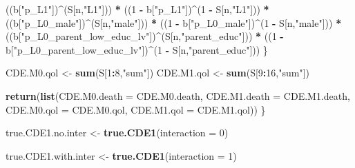 \documentclass[
]{book}
\newenvironment{Shaded}{\begin{snugshade}}{\end{snugshade}}
\newcommand{\AttributeTok}[1]{\textcolor[rgb]{0.13,0.29,0.53}{#1}}
\newcommand{\DecValTok}[1]{\textcolor[rgb]{0.00,0.00,0.81}{#1}}
\newcommand{\FunctionTok}[1]{\textcolor[rgb]{0.13,0.29,0.53}{\textbf{#1}}}
\newcommand{\NormalTok}[1]{#1}
\newcommand{\OtherTok}[1]{\textcolor[rgb]{0.56,0.35,0.01}{#1}}
\newcommand{\SpecialCharTok}[1]{\textcolor[rgb]{0.81,0.36,0.00}{\textbf{#1}}}
\newcommand{\StringTok}[1]{\textcolor[rgb]{0.31,0.60,0.02}{#1}}
\begin{document}
\begin{Shaded}
\begin{Highlighting}[]
\NormalTok{      ((b[}\StringTok{"p\_L1"}\NormalTok{])}\SpecialCharTok{\^{}}\NormalTok{(S[n,}\StringTok{"L1"}\NormalTok{])) }\SpecialCharTok{*}
\NormalTok{      ((}\DecValTok{1} \SpecialCharTok{{-}}\NormalTok{ b[}\StringTok{"p\_L1"}\NormalTok{])}\SpecialCharTok{\^{}}\NormalTok{(}\DecValTok{1} \SpecialCharTok{{-}}\NormalTok{ S[n,}\StringTok{"L1"}\NormalTok{])) }\SpecialCharTok{*}
\NormalTok{      ((b[}\StringTok{"p\_L0\_male"}\NormalTok{])}\SpecialCharTok{\^{}}\NormalTok{(S[n,}\StringTok{"male"}\NormalTok{])) }\SpecialCharTok{*} 
\NormalTok{      ((}\DecValTok{1} \SpecialCharTok{{-}}\NormalTok{ b[}\StringTok{"p\_L0\_male"}\NormalTok{])}\SpecialCharTok{\^{}}\NormalTok{(}\DecValTok{1} \SpecialCharTok{{-}}\NormalTok{ S[n,}\StringTok{"male"}\NormalTok{])) }\SpecialCharTok{*} 
\NormalTok{      ((b[}\StringTok{"p\_L0\_parent\_low\_educ\_lv"}\NormalTok{])}\SpecialCharTok{\^{}}\NormalTok{(S[n,}\StringTok{"parent\_educ"}\NormalTok{])) }\SpecialCharTok{*}
\NormalTok{      ((}\DecValTok{1} \SpecialCharTok{{-}}\NormalTok{ b[}\StringTok{"p\_L0\_parent\_low\_educ\_lv"}\NormalTok{])}\SpecialCharTok{\^{}}\NormalTok{(}\DecValTok{1} \SpecialCharTok{{-}}\NormalTok{ S[n,}\StringTok{"parent\_educ"}\NormalTok{])) }
\NormalTok{    \}}
  
\NormalTok{  CDE.M0.qol }\OtherTok{\textless{}{-}} \FunctionTok{sum}\NormalTok{(S[}\DecValTok{1}\SpecialCharTok{:}\DecValTok{8}\NormalTok{,}\StringTok{"sum"}\NormalTok{])}
\NormalTok{  CDE.M1.qol }\OtherTok{\textless{}{-}} \FunctionTok{sum}\NormalTok{(S[}\DecValTok{9}\SpecialCharTok{:}\DecValTok{16}\NormalTok{,}\StringTok{"sum"}\NormalTok{])}
  
  \FunctionTok{return}\NormalTok{(}\FunctionTok{list}\NormalTok{(}\AttributeTok{CDE.M0.death =}\NormalTok{ CDE.M0.death, }\AttributeTok{CDE.M1.death =}\NormalTok{ CDE.M1.death, }
              \AttributeTok{CDE.M0.qol =}\NormalTok{ CDE.M0.qol, }\AttributeTok{CDE.M1.qol =}\NormalTok{ CDE.M1.qol))}
\NormalTok{\}}
\end{Highlighting}
\end{Shaded}

\begin{Shaded}
\begin{Highlighting}[]
\NormalTok{true.CDE1.no.inter }\OtherTok{\textless{}{-}} \FunctionTok{true.CDE1}\NormalTok{(}\AttributeTok{interaction =} \DecValTok{0}\NormalTok{)}

\NormalTok{true.CDE1.with.inter }\OtherTok{\textless{}{-}} \FunctionTok{true.CDE1}\NormalTok{(}\AttributeTok{interaction =} \DecValTok{1}\NormalTok{)}
\end{Highlighting}
\end{Shaded}
\end{document}
